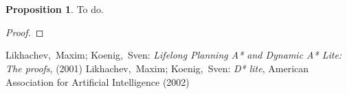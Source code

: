 \documentclass[11pt, fleqn]{amsart}
\theoremstyle{definition}
\theoremstyle{definition}
\theoremstyle{definition}
\theoremstyle{definition}
\newtheorem*{Proposition}{Proposition}
\theoremstyle{remark}
\begin{document}
\clearpage
\appendix
\section{} 
\subsection{}
\label{ssp}
\begin{Proposition} To do.
\end{Proposition} 
\begin{proof}
\end{proof}
\clearpage
{\small
\begin{thebibliography}{99}
 Likhachev,~Maxim; Koenig,~Sven: 
\emph{Lifelong Planning A* and Dynamic A* Lite: The proofs},
(2001)
 Likhachev,~Maxim; Koenig,~Sven: 
\emph{D* lite},
American Association for Artificial Intelligence (2002)
\end{thebibliography}
}
\end{document}
